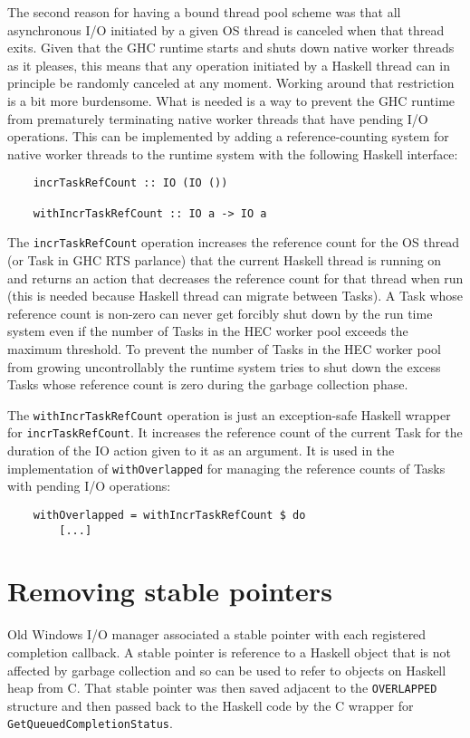 \documentclass[a4paper,11pt,oneside]{report}
\begin{document}
The second reason for having a bound thread pool scheme was that all
asynchronous I/O initiated by a given OS thread is canceled when that thread
exits. Given that the GHC runtime starts and shuts down native worker threads as
it pleases, this means that any operation initiated by a Haskell thread can in
principle be randomly canceled at any moment. Working around that restriction is
a bit more burdensome. What is needed is a way to prevent the GHC runtime from
prematurely terminating native worker threads that have pending I/O
operations. This can be implemented by adding a reference-counting system for
native worker threads to the runtime system with the following Haskell
interface:

\begin{verbatim}
    incrTaskRefCount :: IO (IO ())

    withIncrTaskRefCount :: IO a -> IO a
\end{verbatim}

The \texttt{incrTaskRefCount} operation increases the reference count for the OS
thread (or Task in GHC RTS parlance) that the current Haskell thread is running
on and returns an action that decreases the reference count for that thread when
run (this is needed because Haskell thread can migrate between Tasks). A Task
whose reference count is non-zero can never get forcibly shut down by the run
time system even if the number of Tasks in the HEC worker pool exceeds the
maximum threshold. To prevent the number of Tasks in the HEC worker pool from
growing uncontrollably the runtime system tries to shut down the excess Tasks
whose reference count is zero during the garbage collection phase.

The \texttt{withIncrTaskRefCount} operation is just an exception-safe Haskell
wrapper for \texttt{incrTaskRefCount}. It increases the reference count of the
current Task for the duration of the IO action given to it as an argument. It is
used in the implementation of \texttt{withOverlapped} for managing the reference
counts of Tasks with pending I/O operations:

\begin{verbatim}
    withOverlapped = withIncrTaskRefCount $ do
        [...]
\end{verbatim}

\section{Removing stable pointers}

Old Windows I/O manager associated a stable pointer with each registered
completion callback. A stable pointer is reference to a Haskell object that is
not affected by garbage collection and so can be used to refer to objects on
Haskell heap from C. That stable pointer was then saved adjacent to the
\texttt{OVERLAPPED} structure and then passed back to the Haskell code by the C
wrapper for \texttt{GetQueuedCompletionStatus}.
\end{document}
